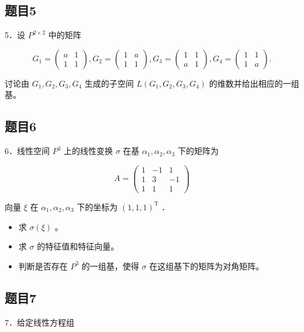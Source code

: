 \documentclass{article}
\begin{document}
\subsection{题目5}
5．设 \(P^{2 \times 2}\) 中的矩阵

\[
G_{1}=\left(\begin{array}{ll}
a & 1 \\
1 & 1
\end{array}\right), G_{2}=\left(\begin{array}{cc}
1 & a \\
1 & 1
\end{array}\right), G_{3}=\left(\begin{array}{cc}
1 & 1 \\
a & 1
\end{array}\right), G_{4}=\left(\begin{array}{cc}
1 & 1 \\
1 & a
\end{array}\right) .
\]

讨论由 \(G_{1}, G_{2}, G_{3}, G_{4}\) 生成的子空间 \(L\left(G_{1}, G_{2}, G_{3}, G_{4}\right)\) 的维数并给出相应的一组基。

\subsection{题目6}
6．线性空间 \(P^{3}\) 上的线性变换 \(\sigma\) 在基 \(\alpha_{1}, \alpha_{2}, \alpha_{3}\) 下的矩阵为

\[
A=\left(\begin{array}{ccc}
1 & -1 & 1 \\
1 & 3 & -1 \\
1 & 1 & 1
\end{array}\right)
\]

向量 \(\xi\) 在 \(\alpha_{1}, \alpha_{2}, \alpha_{3}\) 下的坐标为 \((1,1,1)^{\mathrm{T}}\) ．

\begin{itemize}
  \item[（1）] 求 \(\sigma(\xi)\) 。
  \item[（2）] 求 \(\sigma\) 的特征值和特征向量。
  \item[（3）] 判断是否存在 \(P^{3}\) 的一组基，使得 \(\sigma\) 在这组基下的矩阵为对角矩阵。
\end{itemize}

\subsection{题目7}
7．给定线性方程组
\end{document}
